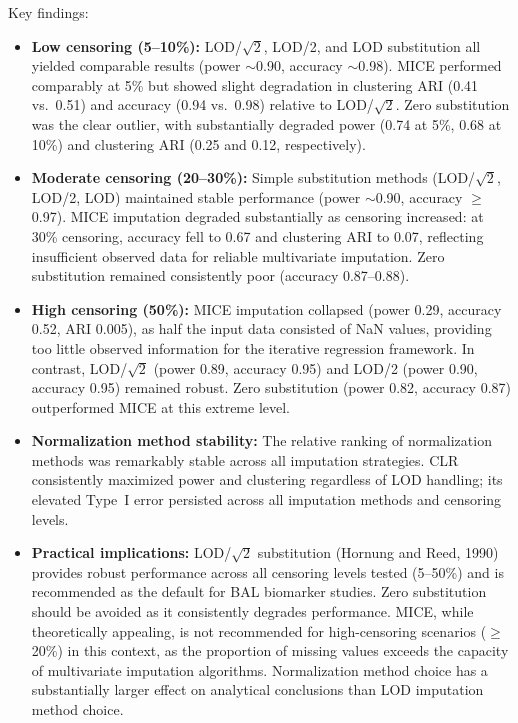 \documentclass[12pt]{article}
\begin{document}
Key findings:

\begin{itemize}
\item \textbf{Low censoring (5--10\%):} LOD/$\sqrt{2}$, LOD/2, and LOD substitution all yielded comparable results (power $\sim$0.90, accuracy $\sim$0.98). MICE performed comparably at 5\% but showed slight degradation in clustering ARI (0.41 vs.\ 0.51) and accuracy (0.94 vs.\ 0.98) relative to LOD/$\sqrt{2}$. Zero substitution was the clear outlier, with substantially degraded power (0.74 at 5\%, 0.68 at 10\%) and clustering ARI (0.25 and 0.12, respectively).

\item \textbf{Moderate censoring (20--30\%):} Simple substitution methods (LOD/$\sqrt{2}$, LOD/2, LOD) maintained stable performance (power $\sim$0.90, accuracy $\geq$0.97). MICE imputation degraded substantially as censoring increased: at 30\% censoring, accuracy fell to 0.67 and clustering ARI to 0.07, reflecting insufficient observed data for reliable multivariate imputation. Zero substitution remained consistently poor (accuracy 0.87--0.88).

\item \textbf{High censoring (50\%):} MICE imputation collapsed (power 0.29, accuracy 0.52, ARI 0.005), as half the input data consisted of NaN values, providing too little observed information for the iterative regression framework. In contrast, LOD/$\sqrt{2}$ (power 0.89, accuracy 0.95) and LOD/2 (power 0.90, accuracy 0.95) remained robust. Zero substitution (power 0.82, accuracy 0.87) outperformed MICE at this extreme level.

\item \textbf{Normalization method stability:} The relative ranking of normalization methods was remarkably stable across all imputation strategies. CLR consistently maximized power and clustering regardless of LOD handling; its elevated Type~I error persisted across all imputation methods and censoring levels.

\item \textbf{Practical implications:} LOD/$\sqrt{2}$ substitution (Hornung and Reed, 1990) provides robust performance across all censoring levels tested (5--50\%) and is recommended as the default for BAL biomarker studies. Zero substitution should be avoided as it consistently degrades performance. MICE, while theoretically appealing, is not recommended for high-censoring scenarios ($\geq$20\%) in this context, as the proportion of missing values exceeds the capacity of multivariate imputation algorithms. Normalization method choice has a substantially larger effect on analytical conclusions than LOD imputation method choice.
\end{itemize}
\end{document}
